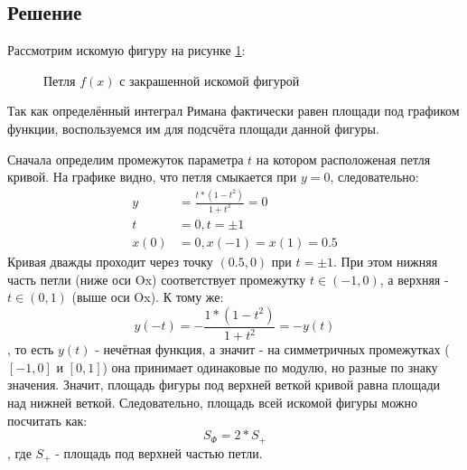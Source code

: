 \documentclass[12pt, a4paper]{article}
\begin{document}
\subsection{Решение}
Рассмотрим искомую фигуру на рисунке \ref{gr:curve}:
\begin{figure}[H]
\caption{Петля $f(x)$ с закрашенной искомой фигурой}
\label{gr:curve}
\end{figure}
Так как определённый интеграл Римана фактически равен площади под графиком функции, воспользуемся им для подсчёта площади данной фигуры.

Сначала определим промежуток параметра $t$ на котором расположеная петля кривой. На графике видно, что петля смыкается
при $y=0$, следовательно:
\begin{equation*}
\begin{aligned}
y &= \frac{t*(1-t^2)}{1+t^2}=0\\
t &= 0, t=\pm1\\
x(0) &= 0, x(-1) = x(1) = 0.5
\end{aligned}
\end{equation*}
Кривая дважды проходит через точку $\left(0.5, 0\right)$ при $t=\pm1$. При этом нижняя часть петли (ниже оси Ox) соответствует промежутку $t\in\left(-1, 0\right)$, а верхняя - $t\in\left(0, 1\right)$ (выше оси Ox). К тому же:
\begin{equation*}
y(-t) = -\frac{1*(1-t^2)}{1+t^2} = -y(t)
\end{equation*},
то есть $y(t)$ - нечётная функция, а значит - на симметричных промежутках ($\left[-1, 0\right]$ и $\left[0, 1\right]$) она принимает одинаковые по модулю, но разные по знаку значения. Значит, площадь фигуры под верхней веткой кривой равна площади над нижней веткой. Следовательно, площадь всей искомой фигуры можно посчитать как:
\begin{equation*}
S_{\Phi} = 2 * S_+
\end{equation*}, где $S_+$ - площадь под верхней частью петли.
\end{document}
